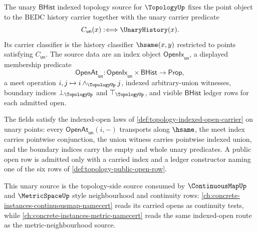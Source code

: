 \begin{definition}
\label{def:topology-unary-bhist-source}
The unary $\mathsf{BHist}$ indexed topology source for $\TopologyUp$ fixes the point object to the BEDC history carrier together with the unary carrier predicate
$$
C_{\mathsf{un}}(x):\Longleftrightarrow \UnaryHistory(x).
$$
Its carrier classifier is the history classifier $\hsame(x,y)$ restricted to points satisfying $C_{\mathsf{un}}$. The source data are an index object $\mathsf{OpenIx}_{\mathsf{un}}$, a displayed membership predicate
$$
\mathsf{OpenAt}_{\mathsf{un}}:\mathsf{OpenIx}_{\mathsf{un}}\times\mathsf{BHist}\to\mathsf{Prop},
$$
a meet operation $i,j\mapsto i\wedge_{\TopologyUp}j$, indexed arbitrary-union witnesses, boundary indices $\bot_{\TopologyUp}$ and $\top_{\TopologyUp}$, and visible $\mathsf{BHist}$ ledger rows for each admitted open.

The fields satisfy the indexed-open laws of \autoref{def:topology-indexed-open-carrier} on unary points: every $\mathsf{OpenAt}_{\mathsf{un}}(i,-)$ transports along $\hsame$, the meet index carries pointwise conjunction, the union witness carries pointwise indexed union, and the boundary indices carry the empty and whole unary predicates. A public open row is admitted only with a carried index and a ledger constructor naming one of the six rows of \autoref{def:topology-public-open-row}.
\end{definition}

This unary source is the topology-side source consumed by $\ContinuousMapUp$ and $\MetricSpaceUp$ style neighbourhood and continuity rows: \autoref{ch:concrete-instances-continuousmap-namecert} reads its carried opens as continuity tests, while \autoref{ch:concrete-instances-metric-namecert} reads the same indexed-open route as the metric-neighbourhood source.

